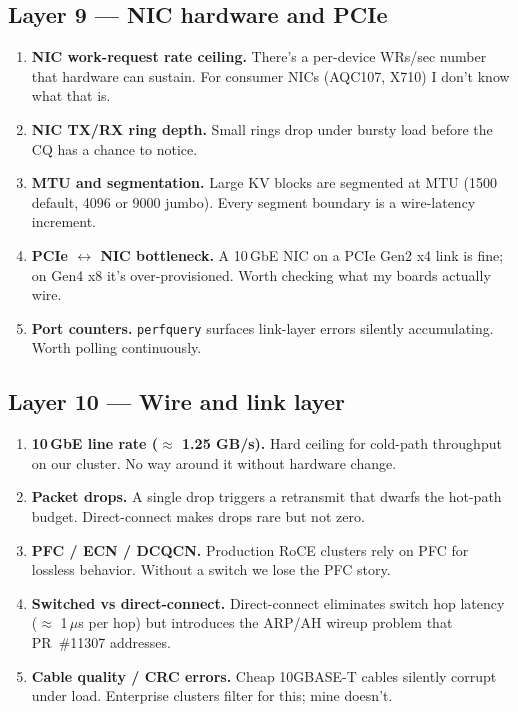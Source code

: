 \documentclass[11pt]{article}
\begin{document}
\subsection*{Layer 9 --- NIC hardware and PCIe}
\begin{enumerate}[resume]
\item \textbf{NIC work-request rate ceiling.} There's a per-device
WRs/sec number that hardware can sustain. For consumer NICs
(AQC107, X710) I don't know what that is.
\item \textbf{NIC TX/RX ring depth.} Small rings drop under bursty
load before the CQ has a chance to notice.
\item \textbf{MTU and segmentation.} Large KV blocks are segmented
at MTU (1500 default, 4096 or 9000 jumbo). Every segment boundary is
a wire-latency increment.
\item \textbf{PCIe $\leftrightarrow$ NIC bottleneck.} A 10\,GbE NIC
on a PCIe Gen2 x4 link is fine; on Gen4 x8 it's over-provisioned.
Worth checking what my boards actually wire.
\item \textbf{Port counters.} \texttt{perfquery} surfaces link-layer
errors silently accumulating. Worth polling continuously.
\end{enumerate}

\subsection*{Layer 10 --- Wire and link layer}
\begin{enumerate}[resume]
\item \textbf{10\,GbE line rate ($\approx$ 1.25 GB/s).} Hard ceiling
for cold-path throughput on our cluster. No way around it without
hardware change.
\item \textbf{Packet drops.} A single drop triggers a retransmit that
dwarfs the hot-path budget. Direct-connect makes drops rare but not
zero.
\item \textbf{PFC / ECN / DCQCN.} Production RoCE clusters rely on
PFC for lossless behavior. Without a switch we lose the PFC story.
\item \textbf{Switched vs direct-connect.} Direct-connect eliminates
switch hop latency ($\approx$ 1\,$\mu$s per hop) but introduces the
ARP/AH wireup problem that PR~\#11307 addresses.
\item \textbf{Cable quality / CRC errors.} Cheap 10GBASE-T cables
silently corrupt under load. Enterprise clusters filter for this;
mine doesn't.
\end{enumerate}
\end{document}

